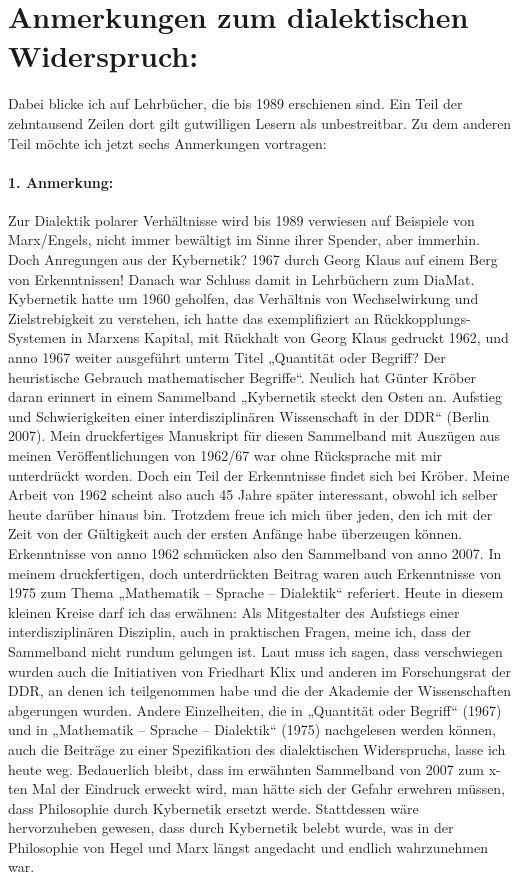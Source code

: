 \documentclass[11pt,a4paper]{article}
\begin{document}
\section{Anmerkungen zum dialektischen Widerspruch:}

Dabei blicke ich auf Lehrbücher, die bis 1989 erschienen sind. Ein Teil der
zehntausend Zeilen dort gilt gutwilligen Lesern als unbestreitbar. Zu dem
anderen Teil möchte ich jetzt sechs Anmerkungen vortragen:

\paragraph{1. Anmerkung:}
Zur Dialektik polarer Verhältnisse wird bis 1989 verwiesen auf Beispiele von
Marx/Engels, nicht immer bewältigt im Sinne ihrer Spender, aber immerhin. Doch
Anregungen aus der Kybernetik? 1967 durch Georg Klaus auf einem Berg von
Erkenntnissen! Danach war Schluss damit in Lehrbüchern zum DiaMat. Kybernetik
hatte um 1960 geholfen, das Verhältnis von Wechselwirkung und Zielstrebigkeit
zu verstehen, ich hatte das exemplifiziert an Rückkopplungs-Systemen in
Marxens Kapital, mit Rückhalt von Georg Klaus gedruckt 1962, und anno 1967
weiter ausgeführt unterm Titel „Quantität oder Begriff? Der heuristische
Gebrauch mathematischer Begriffe“. Neulich hat Günter Kröber daran erinnert in
einem Sammelband „Kybernetik steckt den Osten an. Aufstieg und Schwierigkeiten
einer interdisziplinären Wissenschaft in der DDR“ (Berlin 2007). Mein
druckfertiges Manuskript für diesen Sammelband mit Auszügen aus meinen
Veröffentlichungen von 1962/67 war ohne Rücksprache mit mir unterdrückt
worden.  Doch ein Teil der Erkenntnisse findet sich bei Kröber. Meine Arbeit
von 1962 scheint also auch 45 Jahre später interessant, obwohl ich selber
heute darüber hinaus bin. Trotzdem freue ich mich über jeden, den ich mit der
Zeit von der Gültigkeit auch der ersten Anfänge habe überzeugen können.
Erkenntnisse von anno 1962 schmücken also den Sammelband von anno 2007. In
meinem druckfertigen, doch unterdrückten Beitrag waren auch Erkenntnisse von
1975 zum Thema „Mathematik – Sprache – Dialektik“ referiert. Heute in diesem
kleinen Kreise darf ich das erwähnen: Als Mitgestalter des Aufstiegs einer
interdisziplinären Disziplin, auch in praktischen Fragen, meine ich, dass der
Sammelband nicht rundum gelungen ist. Laut muss ich sagen, dass verschwiegen
wurden auch die Initiativen von Friedhart Klix und anderen im Forschungsrat
der DDR, an denen ich teilgenommen habe und die der Akademie der
Wissenschaften abgerungen wurden. Andere Einzelheiten, die in „Quantität oder
Begriff“ (1967) und in „Mathematik – Sprache – Dialektik“ (1975) nachgelesen
werden können, auch die Beiträge zu einer Spezifikation des dialektischen
Widerspruchs, lasse ich heute weg. Bedauerlich bleibt, dass im erwähnten
Sammelband von 2007 zum x-ten Mal der Eindruck erweckt wird, man hätte sich
der Gefahr erwehren müssen, dass Philosophie durch Kybernetik ersetzt werde.
Stattdessen wäre hervorzuheben gewesen, dass durch Kybernetik belebt wurde,
was in der Philosophie von Hegel und Marx längst angedacht und endlich
wahrzunehmen war.
\end{document}
